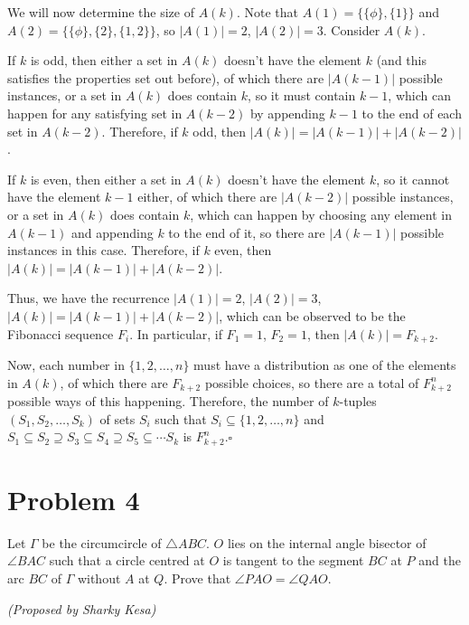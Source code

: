 \documentclass[10pt]{article}
\begin{document}
	We will now determine the size of $A(k)$. Note that $A(1) = \{\{\phi\}, \{1\}\}$ and $A(2) = \{\{\phi\}, \{2\}, \{1, 2\}\}$, so $|A(1)| = 2$, $|A(2)| = 3$. Consider $A(k)$. 
	
	If $k$ is odd, then either a set in $A(k)$ doesn't have the element $k$ (and this satisfies the properties set out before), of which there are $|A(k-1)|$ possible instances, or a set in $A(k)$ does contain $k$, so it must contain $k-1$, which can happen for any satisfying set in $A(k-2)$ by appending $k-1$ to the end of each set in $A(k-2)$. Therefore, if $k$ odd, then $|A(k)| = |A(k-1)| + |A(k-2)|$.
	
	If $k$ is even, then either a set in $A(k)$ doesn't have the element $k$, so it cannot have the element $k-1$ either, of which there are $|A(k-2)|$ possible instances, or a set in $A(k)$ does contain $k$, which can happen by choosing any element in $A(k-1)$ and appending $k$ to the end of it, so there are $|A(k-1)|$ possible instances in this case. Therefore, if $k$ even, then $|A(k)| = |A(k-1)| + |A(k-2)|$.
	
	Thus, we have the recurrence $|A(1)| = 2$, $|A(2)| = 3$, $|A(k)| = |A(k-1)| + |A(k-2)|$, which can be observed to be the Fibonacci sequence $F_i$. In particular, if $F_1 = 1$, $F_2 = 1$, then $|A(k)| = F_{k+2}$.
	
	Now, each number in $\{1, 2, \dots, n\}$ must have a distribution as one of the elements in $A(k)$, of which there are $F_{k+2}$ possible choices, so there are a total of $F_{k+2}^n$ possible ways of this happening. Therefore, the number of \(k\)-tuples \((S_1, S_2, \dots, S_k)\) of sets \(S_i\) such that \(S_i \subseteq \{1, 2, \dots, n\}\) and \(S_1 \subseteq S_2 \supseteq S_3 \subseteq S_4 \supseteq S_5 \subseteq \cdots S_k\) is $F_{k+2}^n$.\hfill\ensuremath{\square}
	
	\newpage
	
	\section*{Problem 4}
	
	Let $\Gamma$ be the circumcircle of $\triangle ABC$. \(O\) lies on the internal angle bisector of \(\angle BAC\) such that a circle centred at $O$ is tangent to the segment $BC$ at $P$ and the arc $BC$ of $\Gamma$ without $A$ at $Q$. Prove that $\angle PAO = \angle QAO$.
	\begin{flushright}
	\textit{(Proposed by Sharky Kesa)}
	\end{flushright}
	
\end{document}
